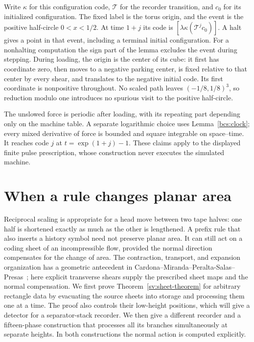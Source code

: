 Write $\kappa$ for this configuration code, $\mathcal T$ for the
recorder transition, and $c_0$ for its initialized configuration.
The fixed label is the torus origin, and the event is the positive
half-circle $0<x<1/2$.  At time $1+j$ its code is
$[\lambda\kappa(\mathcal T^jc_0)]$.  A halt gives a point in
that event, including a terminal initial configuration.  For a
nonhalting computation the sign part of the lemma excludes the event
during stepping.  During loading, the origin is the center of its cube:
it first has coordinate zero, then moves to a negative parking center,
is fixed relative to that center by every shear, and translates to
the negative initial code.  Its first coordinate is nonpositive
throughout.  No scaled path leaves $(-1/8,1/8)^3$, so reduction
modulo one introduces no spurious visit to the positive half-circle.

The unslowed force is periodic after loading, with its repeating part
depending only on the machine table.  A separate logarithmic choice
uses Lemma~\ref{bcs:clock}; every mixed derivative of force is bounded
and square integrable on space--time.  It reaches code $j$ at
$t=\exp(1+j)-1$.  These claims apply to the displayed finite pulse
prescription, whose construction never executes the simulated machine.

\section{When a rule changes planar area}
\label{sv:sheets}

Reciprocal scaling is appropriate for a head move between two tape halves:
one half is shortened exactly as much as the other is lengthened.  A
prefix rule that also inserts a history symbol need not preserve planar
area.  It can still act on a coding sheet of an incompressible flow,
provided the normal direction compensates for the change of area.  The contraction,
transport, and expansion organization has a geometric antecedent in
Cardona--Miranda--Peralta-Salas--Presas~\cite[Proposition~5.1]{CMPP};
here explicit transverse shears supply the prescribed sheet maps and
the normal compensation.
We first prove Theorem~\ref{sv:sheet-theorem} for arbitrary rectangle
data by evacuating the source sheets into storage and processing them
one at a time.  The proof also controls their low-height positions, which
will give a detector for a separator-stack recorder.  We then give a
different recorder and a fifteen-phase construction that processes all
its branches simultaneously at separate heights.  In both constructions
the normal action is computed explicitly.

